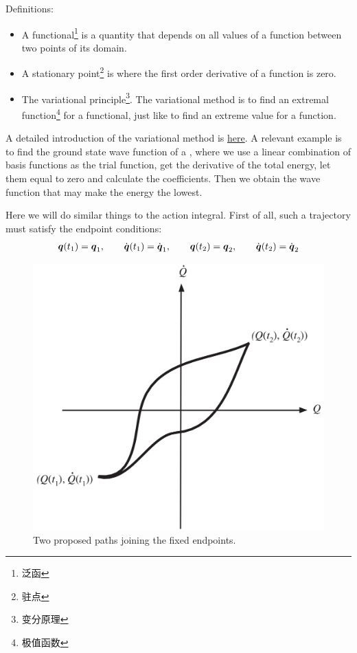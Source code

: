 \begin{tcolorbox}[colback=\TheoremBackground,colframe=\TheoremFrame,coltext=\TheoremColor]
	Definitions:
	\begin{itemize}
		\item A functional\footnote{泛函} is a quantity that depends on all values of a function between two points of its domain.
		\item A stationary point\footnote{驻点} is where the first order derivative of a function is zero.
		\item The variational principle\footnote{变分原理}. The variational method is to find an extremal function\footnote{极值函数} for a functional, just like to find an extreme value for a function.
	\end{itemize}
	A detailed introduction of the variational method is \href{https://zhuanlan.zhihu.com/p/139018146}{here}. A relevant example is to find the ground state wave function of a , where we use a linear combination of basis functions as the trial function, get the derivative of the total energy, let them equal to zero and calculate the coefficients. Then we obtain the wave function that may make the energy the lowest.
\end{tcolorbox}

Here we will do similar things to the action integral. 
First of all, such a trajectory must satisfy the endpoint conditions:
\begin{gather}
	\boldsymbol{q}(t_1)=\boldsymbol{q}_1,\qquad \dot{\boldsymbol{q}}(t_1)=\dot{\boldsymbol{q}}_1,\qquad \boldsymbol{q}(t_2)=\boldsymbol{q}_2,\qquad \dot{\boldsymbol{q}}(t_2)=\dot{\boldsymbol{q}}_2
\end{gather}

\begin{figure}[htbp]
	\centering
	\includegraphics[width=0.6\linewidth]{figure/1-8-qt}
	\caption{Two proposed paths joining the fixed endpoints.}
	\label{fig:1-8-qt}
\end{figure}

